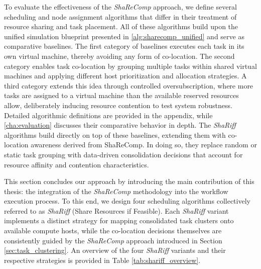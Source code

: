 To evaluate the effectiveness of the \textit{ShaReComp} approach, we define several scheduling and node assignment algorithms that differ in their treatment of resource sharing and task placement. All of these algorithms build upon the unified simulation blueprint presented in \ref{alg:sharecomp_unified} and serve as comparative baselines. The first category of baselines executes each task in its own virtual machine, thereby avoiding any form of co-location. The second category enables task co-location by grouping multiple tasks within shared virtual machines and applying different host prioritization and allocation strategies. A third category extends this idea through controlled oversubscription, where more tasks are assigned to a virtual machine than the available reserved resources allow, deliberately inducing resource contention to test system robustness. Detailed algorithmic definitions are provided in the appendix, while \ref{cha:evaluation} discusses their comparative behavior in depth. The \textit{ShaRiff} algorithms build directly on top of these baselines, extending them with co-location awareness derived from ShaReComp. In doing so, they replace random or static task grouping with data-driven consolidation decisions that account for resource affinity and contention characteristics.

\label{sec:co-location_strategies}

This section concludes our approach by introducing the main contribution of this thesis: the integration of the \textit{ShaReComp} methodology into the workflow execution process. To this end, we design four scheduling algorithms collectively referred to as \textit{ShaRiff} (Share Resources if Feasible). Each \textit{ShaRiff} variant implements a distinct strategy for mapping consolidated task clusters onto available compute hosts, while the co-location decisions themselves are consistently guided by the \textit{ShaReComp} approach introduced in Section \ref{sec:task_clustering}. An overview of the four \textit{ShaRiff} variants and their respective strategies is provided in Table \ref{tab:shariff_overview}.

